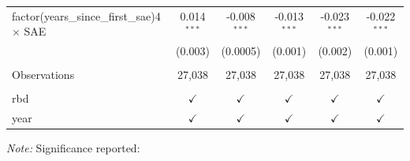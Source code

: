 \begin{table}[htbp]
{{\begin{tabular}{lccccc}
      factor(years\_since\_first\_sae)4 $\times$ SAE      & 0.014$^{***}$  & -0.008$^{***}$ & -0.013$^{***}$ & -0.023$^{***}$ & -0.022$^{***}$\\   
                                                          & (0.003)        & (0.0005)       & (0.001)        & (0.002)        & (0.001)\\   
       \\
      Observations                                        & 27,038         & 27,038         & 27,038         & 27,038         & 27,038\\  
       \\
      rbd                                                 & $\checkmark$   & $\checkmark$   & $\checkmark$   & $\checkmark$   & $\checkmark$\\   
      year                                                & $\checkmark$   & $\checkmark$   & $\checkmark$   & $\checkmark$   & $\checkmark$\\   
      \bottomrule
   \end{tabular}
}}

\vspace{0.2cm}
{\footnotesize \emph{Note:} Significance reported:}
\end{table}
